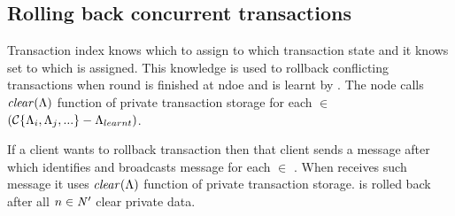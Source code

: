 \subsection{Rolling back concurrent transactions}
Transaction index knows which \paxosRoundId to assign to which transaction state \txState and it knows set \conflictingTxSet to which \txState is assigned. This knowledge is used to rollback conflicting transactions when \paxos round \paxosRoundId is finished at ndoe  and \txStateCommitted is learnt by . The node calls $\mathit{clear}(\text{$\Lambda$})$ function of private transaction storage for each \mbox{\txState $\in$ $(\text{$\mathcal{C}\text{$\{\Lambda_{i}, \Lambda_{j}, ...\}$}$} - \text{$\Lambda_{learnt}$})$}.

If a client \client wants to rollback transaction \transaction then that client
sends a message \txRollbackMessage after which  identifies \nodesTx and broadcasts message \rollbackMessage for each  $\in$ \nodesTx. When  receives such message it
uses $\mathit{clear}(\text{$\Lambda$})$ function of private transaction storage. \transaction is rolled back after all 
\mbox{$n\in \text{$\mathit{N'}$}$} clear private data.